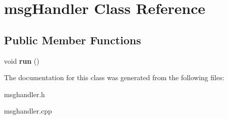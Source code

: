\hypertarget{classmsgHandler}{}\section{msg\+Handler Class Reference}
\label{classmsgHandler}
\subsection*{Public Member Functions}
\begin{DoxyCompactItemize}
\item 
void {\bfseries run} ()\hypertarget{classmsgHandler_ab7b05e4d06aad6c2ff54329da55d3af0}{}\label{classmsgHandler_ab7b05e4d06aad6c2ff54329da55d3af0}

\end{DoxyCompactItemize}


The documentation for this class was generated from the following files\+:\begin{DoxyCompactItemize}
\item 
msghandler.\+h\item 
msghandler.\+cpp\end{DoxyCompactItemize}
